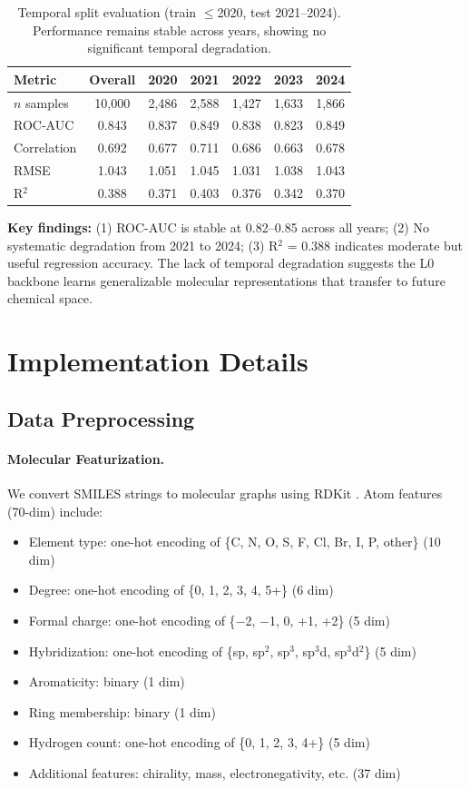 \documentclass{article}
\begin{document}
\begin{table}[h]
\caption{Temporal split evaluation (train $\leq$2020, test 2021--2024). Performance remains stable across years, showing no significant temporal degradation.}
\label{tab:temporal}
\centering
\small
\begin{tabular}{@{}lcccccc@{}}
\toprule
Metric & Overall & 2020 & 2021 & 2022 & 2023 & 2024 \\
\midrule
$n$ samples & 10,000 & 2,486 & 2,588 & 1,427 & 1,633 & 1,866 \\
ROC-AUC & 0.843 & 0.837 & 0.849 & 0.838 & 0.823 & 0.849 \\
Correlation & 0.692 & 0.677 & 0.711 & 0.686 & 0.663 & 0.678 \\
RMSE & 1.043 & 1.051 & 1.045 & 1.031 & 1.038 & 1.043 \\
R$^2$ & 0.388 & 0.371 & 0.403 & 0.376 & 0.342 & 0.370 \\
\bottomrule
\end{tabular}
\end{table}

\textbf{Key findings:} (1) ROC-AUC is stable at 0.82--0.85 across all years; (2) No systematic degradation from 2021 to 2024; (3) R$^2$ = 0.388 indicates moderate but useful regression accuracy. The lack of temporal degradation suggests the L0 backbone learns generalizable molecular representations that transfer to future chemical space.

\section{Implementation Details}
\label{app:implementation}

\subsection{Data Preprocessing}

\paragraph{Molecular Featurization.} We convert SMILES strings to molecular graphs using RDKit \citep{landrum_rdkit}. Atom features (70-dim) include:
\begin{itemize}[noitemsep]
    \item Element type: one-hot encoding of \{C, N, O, S, F, Cl, Br, I, P, other\} (10 dim)
    \item Degree: one-hot encoding of \{0, 1, 2, 3, 4, 5+\} (6 dim)
    \item Formal charge: one-hot encoding of \{$-$2, $-$1, 0, +1, +2\} (5 dim)
    \item Hybridization: one-hot encoding of \{sp, sp$^2$, sp$^3$, sp$^3$d, sp$^3$d$^2$\} (5 dim)
    \item Aromaticity: binary (1 dim)
    \item Ring membership: binary (1 dim)
    \item Hydrogen count: one-hot encoding of \{0, 1, 2, 3, 4+\} (5 dim)
    \item Additional features: chirality, mass, electronegativity, etc. (37 dim)
\end{itemize}
\end{document}
